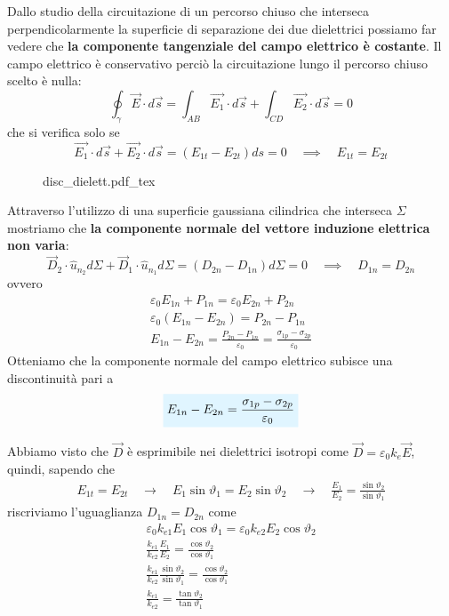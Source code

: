 \documentclass[x11names]{report}
\newcommand{\incfig}[1]{%
	{#1.pdf_tex}
}
\newcommand{\viola}[1]{%
	\colorbox{myblue}{$\displaystyle #1$}
}
\begin{document}
Dallo studio della circuitazione di un percorso chiuso che interseca perpendicolarmente la superficie di separazione dei due dielettrici possiamo far vedere che \textbf{la componente tangenziale del campo elettrico è costante}. Il campo elettrico è conservativo perciò la circuitazione lungo il percorso chiuso scelto è nulla:
\[
\oint_\gamma \vec{E}\cdot d\vec{s} = \int_{AB} \vec{E_1}\cdot d\vec{s} + \int_{CD}  \vec{E_2}\cdot  d\vec{s} = 0
\]
che si verifica solo se
\[
\vec{E_1}\cdot  d\vec{s} + \vec{E_2}\cdot  d\vec{s} =( E_{1t}  - E_{2t})ds = 0 \quad \implies \quad  E_{1t} = E_{2t}
\]

\begin{figure}[H]
	\centering
	\incfig{disc_dielett}
\end{figure}

Attraverso l'utilizzo di una superficie gaussiana cilindrica che interseca \(\Sigma\) mostriamo che \textbf{la componente normale del vettore induzione elettrica non varia}:
\[
\vec{D}_2 \cdot \hat{u}_{n_2} d\Sigma + \vec{D}_1 \cdot \hat{u}_{n_1} d\Sigma = (D_{2n} - D_{1n})d\Sigma = 0 \quad \implies \quad D_{1n} = D_{2n}
\]
ovvero
\begin{gather*}
	\varepsilon_0 E_{1n} + P_{1n} = \varepsilon_0 E_{2n} + P_{2n} \\
	\varepsilon_0\left(E_{1n} - E_{2n}\right) = P_{2n} - P_{1n} \\
	E_{1n} - E_{2n} = \frac{P_{2n} - P_{1n}}{\varepsilon_0} = \frac{\sigma_{1p} - \sigma_{2p}}{\varepsilon_0}
\end{gather*}
Otteniamo che la componente normale del campo elettrico subisce una discontinuità pari a 
\begin{equation}
	\viola{E_{1n} - E_{2n} = \frac{\sigma_{1p} - \sigma_{2p}}{\varepsilon_0}}
\end{equation}

Abbiamo visto che \(\vec{D}\) è esprimibile nei dielettrici isotropi come \(\vec{D} = \varepsilon_0 k_e\vec{E}\), quindi, sapendo che
\begin{gather*}
	E_{1t} = E_{2t} \quad \to \quad E_1\sin\vartheta_1 = E_2\sin\vartheta_2 \quad \to \quad \frac{E_1}{E_2} = \frac{\sin\vartheta_2}{\sin\vartheta_1} 
\end{gather*}
riscriviamo l'uguaglianza \(D_{1n} = D_{2n}\) come 
\begin{gather*}
	\varepsilon_0 k_{e1} E_1\cos\vartheta_1 = \varepsilon_0 k_{e2} E_2\cos\vartheta_2 \\
	\frac{k_{e1}}{k_{e2}}\frac{E_1}{E_2} = \frac{\cos\vartheta_2}{\cos\vartheta_1} \\
	\frac{k_{e1}}{k_{e2}}\frac{\sin\vartheta_2}{\sin\vartheta_1} = \frac{\cos\vartheta_2}{\cos\vartheta_1} \\
	\frac{k_{e1}}{k_{e2}} =\frac{\tan\vartheta_2}{\tan\vartheta_1}
\end{gather*}
\end{document}
